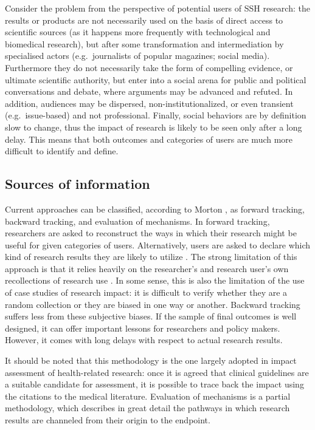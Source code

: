 \documentclass[]{book}
\begin{document}
Consider the problem from the perspective of potential users of SSH
research: the results or products are not necessarily used on the basis
of direct access to scientific sources (as it happens more frequently
with technological and biomedical research), but after some
transformation and intermediation by specialised actors
(e.g.~journalists of popular magazines; social media). Furthermore they
do not necessarily take the form of compelling evidence, or ultimate
scientific authority, but enter into a social arena for public and
political conversations and debate, where arguments may be advanced and
refuted. In addition, audiences may be dispersed, non-institutionalized,
or even transient (e.g.~issue-based) and not professional. Finally,
social behaviors are by definition slow to change, thus the impact of
research is likely to be seen only after a long delay. This means that
both outcomes and categories of users are much more difficult to
identify and define.

\subsection{Sources of information}\label{sources-of-information}

Current approaches can be classified, according to Morton
\citep{morton2015progressing}, as forward tracking, backward tracking,
and evaluation of mechanisms. In forward tracking, researchers are asked
to reconstruct the ways in which their research might be useful for
given categories of users. Alternatively, users are asked to declare
which kind of research results they are likely to utilize
\citep{tang2000pilot}. The strong limitation of this approach is that it
relies heavily on the researcher's and research user's own recollections
of research use \citep{nutley2007using, donovan2011state}. In some
sense, this is also the limitation of the use of case studies of
research impact: it is difficult to verify whether they are a random
collection or they are biased in one way or another. Backward tracking
suffers less from these subjective biases. If the sample of final
outcomes is well designed, it can offer important lessons for
researchers and policy makers. However, it comes with long delays with
respect to actual research results.

It should be noted that this methodology is the one largely adopted in
impact assessment of health-related research: once it is agreed that
clinical guidelines are a suitable candidate for assessment, it is
possible to trace back the impact using the citations to the medical
literature. Evaluation of mechanisms is a partial methodology, which
describes in great detail the pathways in which research results are
channeled from their origin to the endpoint.
\end{document}
